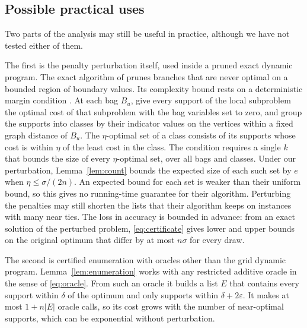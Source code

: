 \subsection{Possible practical uses}
Two parts of the analysis may still be useful in practice, although we
have not tested either of them.

The first is the penalty perturbation itself, used inside a pruned exact
dynamic program. The exact algorithm of \cite{BhathenaStructured} prunes
branches that are never optimal on a bounded region of boundary values.
Its complexity bound rests on a deterministic margin condition
\cite[Definition~5 and Theorem~1]{BhathenaStructured}. At each bag
$B_u$, give every support of the local subproblem the optimal cost of
that subproblem with the bag variables set to zero, and group the
supports into classes by their indicator values on the vertices within a
fixed graph distance of $B_u$. The $\eta$-optimal set of a class
consists of its supports whose cost is within $\eta$ of the least cost
in the class. The condition requires a single $k$ that bounds the size
of every $\eta$-optimal set, over all bags and classes. Under our
perturbation, Lemma~\ref{lem:count} bounds the expected size of each
such set by $e$ when $\eta\le\sigma/(2n)$. An expected bound for each
set is weaker than their uniform bound, so this gives no running-time
guarantee for their algorithm. Perturbing the penalties may still
shorten the lists that their algorithm keeps on instances with many near
ties. The loss in accuracy is bounded in advance: from an exact solution
of the perturbed problem, \eqref{eq:certificate} gives lower and upper
bounds on the original optimum that differ by at most $n\sigma$ for
every draw.

The second is certified enumeration with oracles other than the grid
dynamic program. Lemma~\ref{lem:enumeration} works with any restricted
additive oracle in the sense of \eqref{eq:oracle}. From such an oracle
it builds a list $E$ that contains every support within $\delta$ of the
optimum and only supports within $\delta+2\varepsilon$. It makes at most
$1+n|E|$ oracle calls, so its cost grows with the number of near-optimal
supports, which can be exponential without perturbation.

